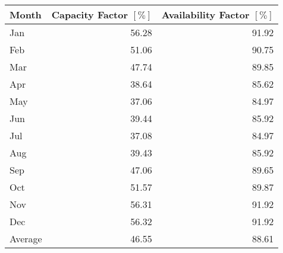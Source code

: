 \begin{tabular}{lrr}
\toprule
   Month &  Capacity Factor $[\%]$ &  Availability Factor $[\%]$ \\
\midrule
     Jan &                   56.28 &                       91.92 \\
     Feb &                   51.06 &                       90.75 \\
     Mar &                   47.74 &                       89.85 \\
     Apr &                   38.64 &                       85.62 \\
     May &                   37.06 &                       84.97 \\
     Jun &                   39.44 &                       85.92 \\
     Jul &                   37.08 &                       84.97 \\
     Aug &                   39.43 &                       85.92 \\
     Sep &                   47.06 &                       89.65 \\
     Oct &                   51.57 &                       89.87 \\
     Nov &                   56.31 &                       91.92 \\
     Dec &                   56.32 &                       91.92 \\
 Average &                   46.55 &                       88.61 \\
\bottomrule
\end{tabular}
